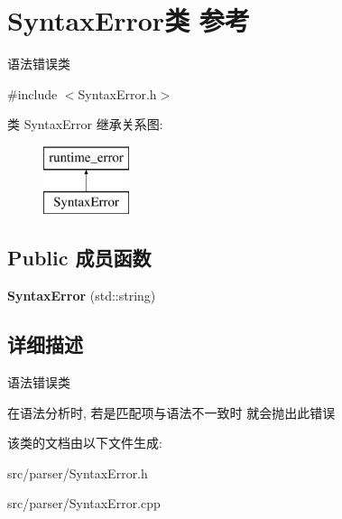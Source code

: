 \hypertarget{class_syntax_error}{}\section{Syntax\+Error类 参考}
\label{class_syntax_error}


语法错误类  




{\ttfamily \#include $<$Syntax\+Error.\+h$>$}

类 Syntax\+Error 继承关系图\+:\begin{figure}[H]
\begin{center}
\leavevmode
\includegraphics[height=2.000000cm]{class_syntax_error}
\end{center}
\end{figure}
\subsection*{Public 成员函数}
\begin{DoxyCompactItemize}
\item 
\mbox{\label{class_syntax_error_a41285cf1cafd071040aec4382e0d7dcd}} 
{\bfseries Syntax\+Error} (std\+::string)
\end{DoxyCompactItemize}


\subsection{详细描述}
语法错误类 

在语法分析时, 若是匹配项与语法不一致时 就会抛出此错误 

该类的文档由以下文件生成\+:\begin{DoxyCompactItemize}
\item 
src/parser/Syntax\+Error.\+h\item 
src/parser/Syntax\+Error.\+cpp\end{DoxyCompactItemize}

